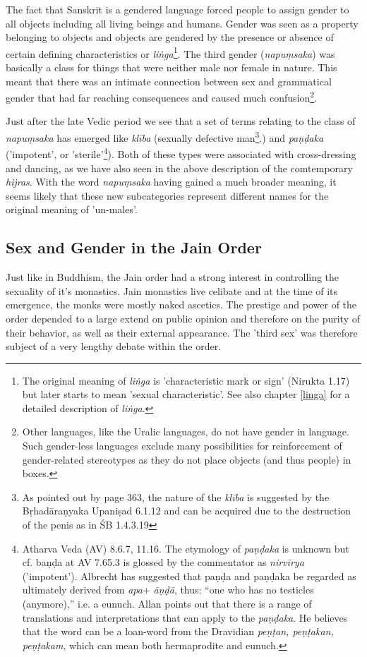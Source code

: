 The fact that Sanskrit is a gendered language forced people to assign gender to all objects including all living beings and humans. Gender was seen as a property belonging to objects and objects are gendered by the presence or absence of certain defining characteristics or {\em liṅga}\footnote{The original meaning of {\em liṅga} is 'characteristic mark or sign' (Nirukta 1.17) but later starts to mean 'sexual characteristic'. See also chapter \ref{linga} for a detailed description of {\em liṅga}.}. The third gender ({\em napuṃsaka}) was basically a class for things that were neither male nor female in nature. This meant that there was an intimate connection between sex and grammatical gender that had far reaching consequences and caused much confusion\footnote{Other languages, like the Uralic languages, do not have gender in language. Such gender-less languages exclude many possibilities for reinforcement of gender-related stereotypes as they do not place objects (and thus people) in boxes.}. 

Just after the late Vedic period we see that a set of terms relating to the class of {\em napuṃsaka} has emerged like {\em klība} (sexually defective man\footnote{As pointed out by \cite{zwilling} page 363, the nature of the {\em klība} is suggested by the Bṛhadāraṇyaka Upaniṣad 6.1.12 and can be acquired due to the destruction of the penis as in ŚB 1.4.3.19}.) and {\em paṇḍaka} ('impotent', or 'sterile'\footnote{Atharva Veda (AV) 8.6.7, 11.16. The etymology of {\em paṇḍaka} is unknown but cf. baṇḍa at AV 7.65.3 is glossed by the commentator as {\em nirvīrya} ('impotent'). Albrecht \cite{wezler} has suggested that paṇḍa and paṇḍaka be regarded as ultimately derived from {\em *apa}+ {\em āṇḍā}, thus: “one who has no testicles (anymore),” i.e. a eunuch. Allan \cite{bomhard} points out that there is a range of translations and interpretations that can apply to the {\em paṇḍaka}. He believes that the word can be a loan-word from the Dravidian {\em peṇṭan, peṇṭakan, peṇṭakam}, which can mean both hermaprodite and eunuch.}). Both of these types were associated with cross-dressing and dancing, as we have also seen in the above description of the comtemporary {\em hijras}. With the word {\em napuṃsaka} having gained a much broader meaning, it seems likely that these new subcategories represent different names for the original meaning of 'un-males'.

\subsection{Sex and Gender in the Jain Order}
Just like in Buddhism, the Jain order had a strong interest in controlling the sexuality of it's monastics. Jain monastics live celibate and at the time of its emergence, the monks were mostly naked ascetics. The prestige and power of the order depended to a large extend on public opinion and therefore on the purity of their behavior, as well as their external appearance. The 'third sex' was therefore subject of a very lengthy debate within the order. 

